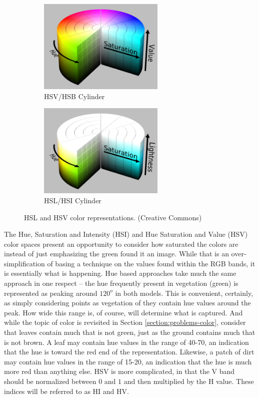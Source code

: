 \documentclass[letterpaper, notitlepage]{report}
\begin{document}
{\begin{figure}[H]
	\centering
	\begin{subfigure}[h]{.45\textwidth}
		\centering
		\includegraphics[width=6cm]{./figures/HSV_color_solid_cylinder_saturation_gray.png}
		\caption{HSV/HSB Cylinder}
		\label{fig:hsv}
	\end{subfigure}
	\hfill
	\begin{subfigure}[h]{.45\textwidth}
		\centering
		\includegraphics[width=6cm]{./figures/HSL_color_solid_cylinder_saturation_gray.png}
		\caption{HSL/HSI Cylinder}
		\label{fig:hsl}
	\end{subfigure}
	\caption[HSL and HSV color representations]{HSL and HSV color representations. (Creative Commons)}
	\label{fig:overlap}
\end{figure}



The Hue, Saturation and Intensity (HSI) and Hue Saturation and Value (HSV) color spaces present an opportunity to consider how saturated the colors are instead of just emphasizing the green found it an image. While that is  an over-simplification of basing a technique on the values found within the RGB bands, it is essentially what is happening. Hue based approaches take much the same approach in one respect -- the hue frequently present in vegetation (green) is represented as peaking around $120^o$ in both models. This is convenient, certainly, as simply considering points as vegetation of they contain hue values around the peak. How wide this range is, of course, will determine what is captured. And while the topic of color is revisited in Section \ref{section:problems-color}, consider that leaves contain much that is not green, just as the ground contains much that is not brown. A leaf may contain hue values in the range of 40-70, an indication that the hue is toward the red end of the representation. Likewise, a patch of dirt may contain hue values in the range of 15-20, an indication that the hue is much more red than anything else. HSV is  more complicated, in that the V band should be normalized between $0$ and $1$ and then multiplied by the H value. These indices will be referred to as HI and HV. 

}
\end{document}
